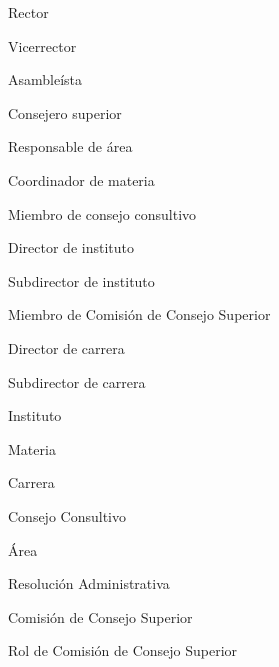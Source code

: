    \item Rector
    \item Vicerrector
    \item Asambleísta
    \item Consejero superior
    \item Responsable de área
    \item Coordinador de materia
    \item Miembro de consejo consultivo
    \item Director de instituto
    \item Subdirector de instituto
    \item Miembro de Comisión de Consejo Superior
    \item Director de carrera
    \item Subdirector de carrera
    \item Instituto
    \item Materia
    \item Carrera
    \item Consejo Consultivo
    \item Área
    \item Resolución Administrativa
    \item Comisión de Consejo Superior
    \item Rol de Comisión de Consejo Superior
